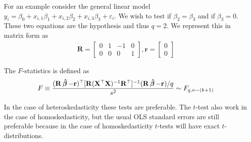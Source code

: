 For an example consider the general linear model $y_i = \beta_0 + x_{i,1}\beta_{1} + x_{i,2}\beta_{2} + x_{i,3}\beta_{3} + \varepsilon_i$. We wish to test if $\beta_2 = \beta_3$ and if $\beta_3 = 0$. These two equations are the hypothesis and thus $q = 2$. We represent this in matrix form as
\begin{align*}
    \mathbf{R} = \begin{bmatrix}0 & 1 & -1 & 0\\
    0 & 0 & 0 & 1\end{bmatrix}, \mathbf{r} = \begin{bmatrix}0\\0\end{bmatrix}
\end{align*}

The $F$-statistics is defined as
\begin{align*}
    F &\equiv \dfrac{(\mathbf{R}\operatorname{\boldsymbol{\hat{\beta}}} - \mathbf{r})^\top  [\mathbf{R}(\mathbf{X}^\top \mathbf{X})^{-1}\mathbf{R}^\top]^{-1}  (\mathbf{R}\operatorname{\boldsymbol{\hat{\beta}}}- \mathbf{r}) / q}{s^2} \sim F_{q, n - (k+1)}\\
\end{align*}



In the case of heteroskedasticity these tests are preferable. 
The $t$-test also work in the case of homoskedasticity, but the usual OLS standard errors are still preferable because in the case of homoskedasticity $t$-tests will have exact $t$-distributions. 

